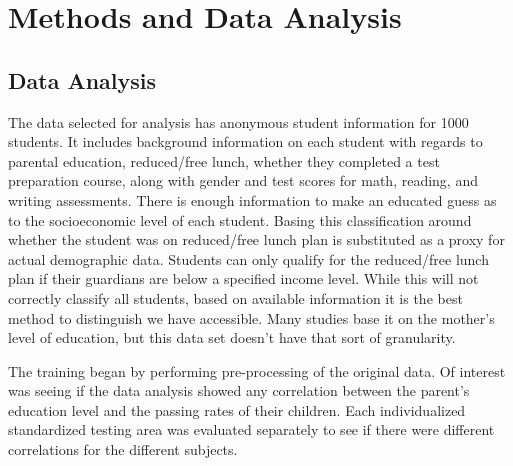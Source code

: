 \documentclass[doc]{apa6} %
\begin{document}
\section{Methods and Data Analysis}
\subsection{Data Analysis}
The data selected for analysis has anonymous student information for 1000 students. It includes background information on each student with regards to parental education, reduced/free lunch, whether they completed a test preparation course, along with gender and test scores for math, reading, and writing assessments. There is enough information to make an educated guess as to the socioeconomic level of each student. Basing this classification around whether the student was on reduced/free lunch plan is substituted as a proxy for actual demographic data. Students can only qualify for the reduced/free lunch plan if their guardians are below a specified income level. While this will not correctly classify all students, based on available information it is the best method to distinguish we have accessible. Many studies base it on the mother's level of education, but this data set doesn't have that sort of granularity. \cite{maternaleducation} \cite{maternaleducation2} \cite{maternaleducation3}

The training began by performing pre-processing of the original data. Of interest was seeing if the data analysis showed any correlation between the parent's education level and the passing rates of their children. Each individualized standardized testing area was evaluated separately to see if there were different correlations for the different subjects. 
\end{document}
